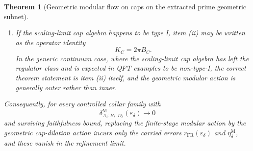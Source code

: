 \documentclass[11pt]{article}
\newtheorem{theorem}{Theorem}[section]
\begin{document}
\begin{theorem}[Geometric modular flow on caps on the extracted prime geometric subnet]
\begin{enumerate}[label=\textup{(\roman*)},leftmargin=2em]
\item If the scaling-limit cap algebra happens to be type I, item \textup{(ii)} may be written as the operator identity
\[
K_C=2\pi B_C.
\]
In the generic continuum case, where the scaling-limit cap algebra has left the regulator class and is expected in QFT examples to be non-type-I, the correct theorem statement is item \textup{(ii)} itself, and the geometric modular action is generally outer rather than inner.
\end{enumerate}

Consequently, for every controlled collar family with
\[
\delta^{\mathrm M}_{A_\delta:B_\delta:D_\delta}(\varepsilon_\delta)\to 0
\]
and surviving faithfulness bound, replacing the finite-stage modular action by the geometric cap-dilation action incurs only the carried errors \(r_{\mathrm{FR}}(\varepsilon_\delta)\) and \(\eta_\delta^{\mathrm M}\), and these vanish in the refinement limit.
\end{theorem}
\end{document}
